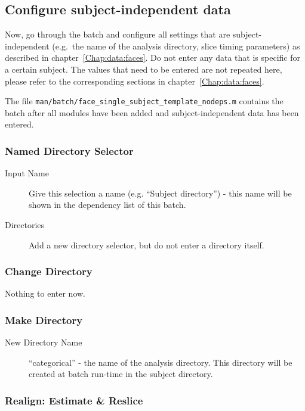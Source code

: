 \subsection{Configure subject-independent data}

Now, go through the batch and configure all settings that are
subject-independent (e.g.\ the name of the analysis directory, slice timing
parameters) as described in chapter~\ref{Chap:data:faces}. Do not enter any data that
is specific for a certain subject. The values that need to be entered are not
repeated here, please refer to the corresponding sections in
chapter~\ref{Chap:data:faces}.

The file \verb|man/batch/face_single_subject_template_nodeps.m| contains the
batch after all modules have been added and subject-independent data has been
entered.

\subsubsection*{Named Directory Selector}

\begin{description}
\item[Input Name] Give this selection a name (e.g. ``Subject directory'') -
  this name will be shown in the dependency list of this batch.
\item[Directories] Add a new directory selector, but do not enter a
  directory itself.
\end{description}

\subsubsection*{Change Directory} 

Nothing to enter now.

\subsubsection*{Make Directory}

\begin{description}
\item[New Directory Name] ``categorical'' - the name of the analysis
  directory. This directory will be created at batch run-time in the subject
  directory. 
\end{description}

\subsubsection*{Realign: Estimate \& Reslice}

